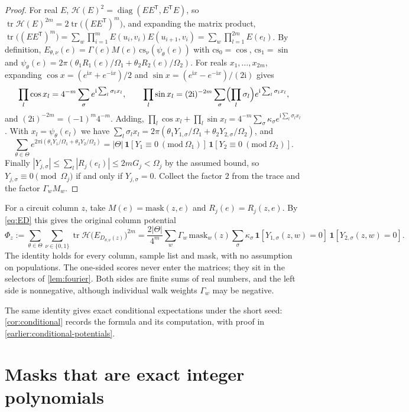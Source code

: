 \documentclass[11pt,letterpaper]{article}
\theoremstyle{definition}
\theoremstyle{remark}
\newcommand{\tr}{\operatorname{tr}}
\newcommand{\diag}{\operatorname{diag}}
\newcommand{\mask}{\mathrm{mask}}
\newcommand{\ind}{\mathbf 1}
\newcommand{\cH}{\mathcal H}
\newcommand{\iu}{\mathrm i}
\begin{document}
\begin{proof}
For real \(E\), \(\cH(E)^2=\diag(EE^{\mathsf T},E^{\mathsf T}E)\), so
\(\tr\cH(E)^{2m}=2\tr\bigl((EE^{\mathsf T})^m\bigr)\), and expanding the matrix
product,
\(\tr\bigl((EE^{\mathsf T})^m\bigr)=\sum_w\prod_{i=1}^mE(u_i,v_i)E(u_{i+1},v_i)=\sum_w\prod_{l=1}^{2m}E(e_l)\).
By definition,
\(E_{\theta,\nu}(e)=\Gamma(e)M(e)\,\mathrm{cs}_\nu(\psi_\theta(e))\)
with \(\mathrm{cs}_0=\cos\), \(\mathrm{cs}_1=\sin\) and
\(\psi_\theta(e)=2\pi(\theta_1R_1(e)/\Omega_1+\theta_2R_2(e)/\Omega_2)\).
For reals \(x_1,\dots,x_{2m}\), expanding
\(\cos x=(e^{\iu x}+e^{-\iu x})/2\) and
\(\sin x=(e^{\iu x}-e^{-\iu x})/(2\iu)\) gives
\[
 \prod_l\cos x_l=4^{-m}\sum_\sigma e^{\iu\sum_l\sigma_lx_l},\qquad
 \prod_l\sin x_l=(2\iu)^{-2m}\sum_\sigma\Bigl(\prod_l\sigma_l\Bigr)e^{\iu\sum_l\sigma_lx_l},
\]
and \((2\iu)^{-2m}=(-1)^m4^{-m}\). Adding,
\(\prod_l\cos x_l+\prod_l\sin x_l=4^{-m}\sum_\sigma\kappa_\sigma e^{\iu\sum_l\sigma_lx_l}\).
With \(x_l=\psi_\theta(e_l)\) we have
\(\sum_l\sigma_lx_l=2\pi(\theta_1Y_{1,\sigma}/\Omega_1+\theta_2Y_{2,\sigma}/\Omega_2)\),
and
\[
 \sum_{\theta\in\Theta}e^{2\pi\iu(\theta_1Y_1/\Omega_1+\theta_2Y_2/\Omega_2)}
 =|\Theta|\,\ind[Y_1\equiv0\ (\mathrm{mod}\ \Omega_1)]\,\ind[Y_2\equiv0\ (\mathrm{mod}\ \Omega_2)].
\]
Finally \(|Y_{j,\sigma}|\le\sum_l|R_j(e_l)|\le2mG_j<\Omega_j\) by the assumed bound, so \(Y_{j,\sigma}\equiv0\pmod{\Omega_j}\) if and
only if \(Y_{j,\sigma}=0\). Collect the factor \(2\) from the trace and
the factor \(\Gamma_wM_w\).
\end{proof}

For a circuit column \(z\), take \(M(e)=\mask(z,e)\) and \(R_j(e)=R_j(z,e)\). By \eqref{eq:ED} this gives the original column potential
\[
 \Phi_z:=\sum_{\theta\in\Theta}\sum_{\nu\in\{0,1\}}\tr\cH\bigl(E_{D_{\theta,\nu}(z)}\bigr)^{2m}
 =\frac{2|\Theta|}{4^m}\sum_{w}\Gamma_w\,\mask_w(z)\sum_{\sigma}\kappa_\sigma\,
 \ind[Y_{1,\sigma}(z,w)=0]\,\ind[Y_{2,\sigma}(z,w)=0].
\]
The identity holds for every column, sample list and mask, with no
assumption on populations. The one-sided scores never enter the
matrices; they sit in the selectors of \cref{lem:fourier}. Both sides
are finite sums of real numbers, and the left side is nonnegative,
although individual walk weights \(\Gamma_w\) may be negative.

The same identity gives exact conditional expectations under the
short seed: \cref{cor:conditional} records the formula and its
computation, with proof in \cref{earlier:conditional-potentials}.


\section{Masks that are exact integer polynomials}\label{sec:masks}
\end{document}
